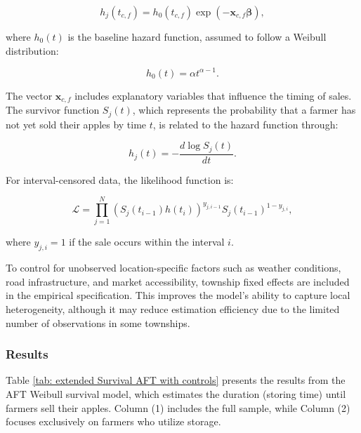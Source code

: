 \begin{equation}
    h_j(t_{c,f}) = h_0(t_{c,f}) \exp\left(-\mathbf{x}_{c,f} \boldsymbol{\beta}\right),
\end{equation}

where \(h_0(t)\) is the baseline hazard function, assumed to follow a Weibull distribution:

\begin{equation}
    h_0(t) = \alpha t^{\alpha-1}.
\end{equation}

The vector \(\mathbf{x}_{c,f}\) includes explanatory variables that influence the timing of sales. The survivor function \(S_j(t)\), which represents the probability that a farmer has not yet sold their apples by time \(t\), is related to the hazard function through:

\begin{equation}
    h_j(t) = -\frac{d \log S_j(t)}{dt}.
\end{equation}

For interval-censored data, the likelihood function is:

\begin{equation}
    \mathcal{L} = \prod_{j=1}^N \left(S_j(t_{i-1}) h(t_i)\right)^{y_{j,i-1}} S_j(t_{i-1})^{1-y_{j,i}},
\end{equation}

where \(y_{j,i} = 1\) if the sale occurs within the interval \(i\).

To control for unobserved location-specific factors such as weather conditions, road infrastructure, and market accessibility, township fixed effects are included in the empirical specification. This improves the model’s ability to capture local heterogeneity, although it may reduce estimation efficiency due to the limited number of observations in some townships.



\subsubsection{Results}
\noindent 
Table \ref{tab: extended Survival AFT with controls} presents the results from the AFT Weibull survival model, which estimates the duration (storing time) until farmers sell their apples. Column (1) includes the full sample, while Column (2) focuses exclusively on farmers who utilize storage.

